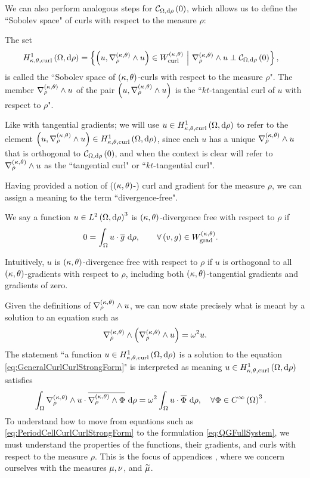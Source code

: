 We can also perform analogous steps for $\mathcal{C}_{ \Omega, \mathrm{d}\rho}\left( 0 \right)$, which allows us to define the ``Sobolev space" of curls with respect to the measure $\rho$:
\begin{definition} \label{def:CurlSobSpace}
	The set
	\begin{align*}
		H^1_{\kappa,\theta,\mathrm{curl}}\left( \Omega, \mathrm{d}\rho \right) &= \left\{  \left( u, \nabla_{\rho}^{\left( \kappa, \theta \right)}\wedge u \right)\in W^{\left( \kappa, \theta \right)}_{\mathrm{curl}} \ \middle\vert \  \nabla_{\rho}^{\left( \kappa, \theta \right)}\wedge u \perp \mathcal{C}_{ \Omega, \mathrm{d}\rho}\left( 0 \right)  \right\},
	\end{align*}
	is called the ``Sobolev space of $\left( \kappa, \theta \right)$-curls with respect to the measure $\rho$".
	The member $\nabla_{\rho}^{\left( \kappa, \theta \right)}\wedge u$ of the pair $\left( u, \nabla_{\rho}^{\left( \kappa, \theta \right)}\wedge u \right)$ is the ``$kt$-tangential curl of $u$ with respect to $\rho$".
\end{definition}
Like with tangential gradients; we will use $u\in H^1_{\kappa,\theta,\mathrm{curl}}\left( \Omega, \mathrm{d}\rho \right)$ to refer to the element $\left( u, \nabla_{\rho}^{\left( \kappa, \theta \right)}\wedge u \right)\in H^1_{\kappa,\theta,\mathrm{curl}}\left( \Omega, \mathrm{d}\rho \right)$, since each $u$ has a unique $\nabla_{\rho}^{\left( \kappa, \theta \right)}\wedge u$ that is orthogonal to $\mathcal{C}_{ \Omega, \mathrm{d}\rho}\left( 0 \right)$, and when the context is clear will refer to $\nabla_{\rho}^{\left( \kappa, \theta \right)}\wedge u$ as the ``tangential curl" or ``$kt$-tangential curl".

Having provided a notion of ($\left( \kappa, \theta \right)$-) curl and gradient for the measure $\rho$, we can assign a meaning to the term ``divergence-free".
\begin{definition} \label{def:ktDivergenceFree}
We say a function $u\in L^{2}\left( \Omega,\mathrm{d}\rho \right)^3$ is $\left( \kappa, \theta \right)$-divergence free with respect to $\rho$ if 
\begin{align*}
	0 &= \int_{\Omega} u\cdot\overline{g}  \ \mathrm{d}\rho, \qquad\forall \left( v,g \right)\in W^{\left( \kappa, \theta \right)}_{\mathrm{grad}}.
\end{align*}
\end{definition}
Intuitively, $u$ is $\left( \kappa, \theta \right)$-divergence free with respect to $\rho$ if $u$ is orthogonal to all $\left( \kappa, \theta \right)$-gradients with respect to $\rho$, including both $\left( \kappa, \theta \right)$-tangential gradients and gradients of zero.

Given the definitions of $\nabla_{\rho}^{\left( \kappa, \theta \right)}\wedge u$, we can now state precisely what is meant by a solution to an equation such as 
\begin{align} \label{eq:GeneralCurlCurlStrongForm}
	\nabla_{\rho}^{\left( \kappa, \theta \right)}\wedge \left(  \nabla_{\rho}^{\left( \kappa, \theta \right)}\wedge u  \right) = \omega^2 u.
\end{align}
The statement ``a function $u\in H^1_{\kappa,\theta,\mathrm{curl}}\left( \Omega, \mathrm{d}\rho \right)$ is a solution to the equation \eqref{eq:GeneralCurlCurlStrongForm}" is interpreted as meaning $u\in H^1_{\kappa,\theta,\mathrm{curl}}\left( \Omega, \mathrm{d}\rho \right)$ satisfies
\begin{align*}
	\int_{\Omega} \nabla_{\rho}^{\left( \kappa, \theta \right)}\wedge u \cdot \overline{\nabla_{\rho}^{\left( \kappa, \theta \right)}\wedge\Phi}  \ \mathrm{d}\rho &= \omega^2\int_{\Omega} u\cdot\overline{\Phi} \ \mathrm{d}\rho, \quad\forall\Phi\in C^{\infty}\left( \Omega \right)^3.
\end{align*}
To understand how to move from equations such as \eqref{eq:PeriodCellCurlCurlStrongForm} to the formulation \eqref{eq:QGFullSystem}, we must understand the properties of the functions, their gradients, and curls with respect to the measure $\rho$.
This is the focus of appendices , where we concern ourselves with the measures $\mu, \nu$, and $\widetilde{\mu}$.

